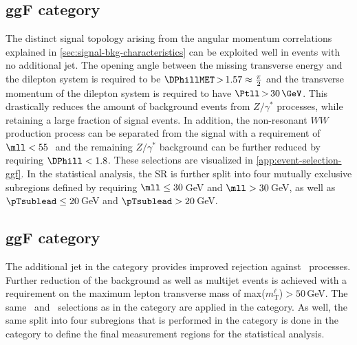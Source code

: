 
\subsection{ggF \ZeroJet category}
\label{subsec:ggf-zero-jet-category}
The distinct signal topology arising from the angular momentum correlations explained in \cref{sec:signal-bkg-characteristics} can be exploited well in events with no additional jet.
The opening angle between the missing transverse energy and the dilepton system is required to be $\DPhillMET \,{>}\, 1.57 \approx \frac{\pi}{2}$ and the transverse momentum of the dilepton system is required to have $\Ptll \,{>}\, 30\,\GeV$.
This drastically reduces the amount of background events from $Z/\gamma^*$ processes, while retaining a large fraction of signal events.
In addition, the non-resonant $WW$ production process can be separated from the signal with a requirement of $\mll < 55$\,\GeV\ and the remaining $Z/\gamma^*$ background can be further reduced by requiring $\DPhill < 1.8$. These selections are visualized in \cref{app:event-selection-ggf}.
In the statistical analysis, the \ZeroJet SR is further split into four mutually exclusive subregions defined by requiring $\mll \le 30$\,GeV and $\mll > 30$\,GeV, as well as $\pTsublead \le 20$\,GeV and $\pTsublead > 20$\,GeV.

\subsection{ggF \OneJet category}
\label{subsec:ggf-one-jet-category}
The additional jet in the \OneJet category provides improved rejection against \Ztautau\ processes.
Further reduction of the \Zgamma background as well as multijet events is achieved with a requirement on the maximum lepton transverse mass of max($m_{\text{T}}^\ell$)$ > 50\,$GeV.
The same \mll\ and \DPhill\ selections as in the \ZeroJet category are applied in the \OneJet category.
As well, the same split into four subregions that is performed in the \ZeroJet category is done in the \OneJet category to define the final measurement regions for the statistical analysis. 

